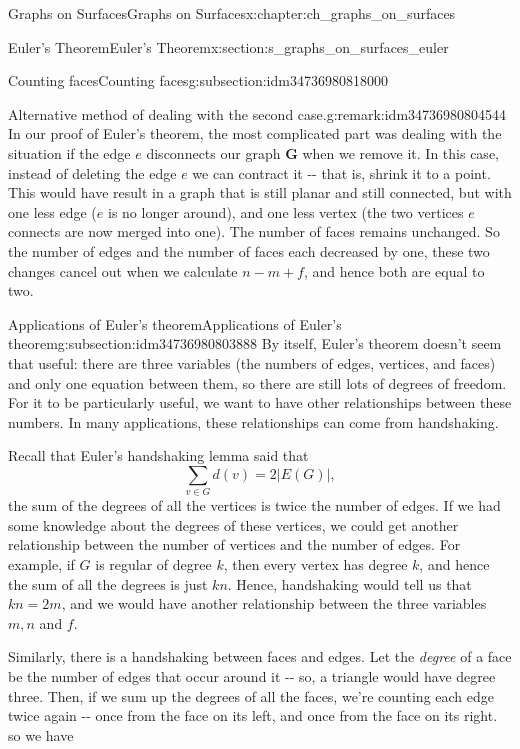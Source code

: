 \documentclass[oneside,10pt,]{book}
\numberwithin{equation}{section}
\newcommand{\bfG}{\mathbf{G}}
\begin{document}
\begin{chapterptx}{Graphs on Surfaces}{}{Graphs on Surfaces}{}{}{x:chapter:ch_graphs_on_surfaces}
\begin{sectionptx}{Euler's Theorem}{}{Euler's Theorem}{}{}{x:section:s_graphs_on_surfaces_euler}
\begin{subsectionptx}{Counting faces}{}{Counting faces}{}{}{g:subsection:idm34736980818000}
\begin{remark}{Alternative method of dealing with the second case.}{g:remark:idm34736980804544}
In our proof of Euler's theorem, the most complicated part was dealing with the situation if the edge \(e\) disconnects our graph \(\bfG\) when we remove it. In this case, instead of deleting the edge \(e\) we can contract it -{}-{} that is, shrink it to a point.  This would have result in a graph that is still planar and still connected, but with one less edge (\(e\) is no longer around), and one less vertex (the two vertices \(e\) connects are now merged into one).  The number of faces remains unchanged.  So the number of edges and the number of faces each decreased by one, these two changes cancel out when we calculate \(n-m+f\), and hence both are equal to two.%
\end{remark}
\end{subsectionptx}
%
%
\typeout{************************************************}
\typeout{************************************************}
%
\begin{subsectionptx}{Applications of Euler's theorem}{}{Applications of Euler's theorem}{}{}{g:subsection:idm34736980803888}
By itself, Euler's theorem doesn't seem that useful: there are three variables (the numbers of edges, vertices, and faces) and only one equation between them, so there are still lots of degrees of freedom.  For it to be particularly useful, we want to have other relationships between these numbers.  In many applications, these relationships can come from handshaking.%
\par
Recall that Euler's handshaking lemma said that%
\begin{equation*}
\sum_{v\in G} d(v)=2 |E(G)|,
\end{equation*}
the sum of the degrees of all the vertices is twice the number of edges.  If we had some knowledge about the degrees of these vertices, we could get another relationship between the number of vertices and the number of edges.  For example, if \(G\) is regular of degree \(k\), then every vertex has degree \(k\), and hence the sum of all the degrees is just \(kn\).  Hence, handshaking would tell us that \(kn=2m\), and we would have another relationship between the three variables \(m,n\) and \(f\).%
\par
Similarly, there is a handshaking between faces and edges.  Let the \emph{degree} of a face be the number of edges that occur around it -{}-{} so, a triangle would have degree three.  Then, if we sum up the degrees of all the faces, we're counting each edge twice again -{}-{} once from the face on its left, and once from the face on its right.  so we have%

\end{subsectionptx}
\end{sectionptx}
\end{chapterptx}
\end{document}
